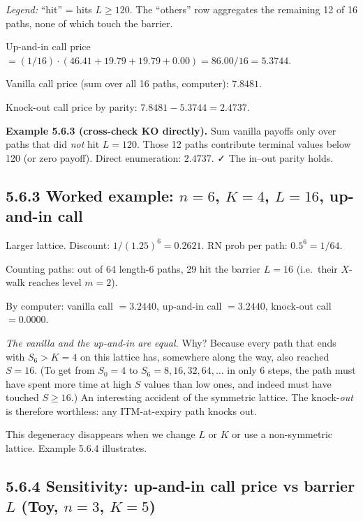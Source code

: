\documentclass[
  10pt,
  twoside]{book}
\newcounter{none} %
\begin{document}
\emph{Legend:} ``hit'' = hits \(L \ge 120\). The ``others'' row
aggregates the remaining 12 of 16 paths, none of which touch the
barrier.

Up-and-in call price
\(= (1/16) \cdot (46.41 + 19.79 + 19.79 + 0.00) = 86.00/16 = \mathbf{5.3744}\).

Vanilla call price (sum over all 16 paths, computer):
\(\mathbf{7.8481}\).

Knock-out call price by parity: \(7.8481 - 5.3744 = \mathbf{2.4737}\).

\textbf{Example 5.6.3 (cross-check KO directly).} Sum vanilla payoffs
only over paths that did \emph{not} hit \(L = 120\). Those 12 paths
contribute terminal values below 120 (or zero payoff). Direct
enumeration: \(2.4737\). ✓ The in--out parity holds.

\subsection{\texorpdfstring{5.6.3 Worked example: \(n = 6\), \(K = 4\),
\(L = 16\), up-and-in
call}{5.6.3 Worked example: n = 6, K = 4, L = 16, up-and-in call}}\label{worked-example-n-6-k-4-l-16-up-and-in-call}

Larger lattice. Discount: \(1/(1.25)^6 = 0.2621\). RN prob per path:
\(0.5^6 = 1/64\).

Counting paths: out of 64 length-6 paths, 29 hit the barrier \(L = 16\)
(i.e.~their \(X\)-walk reaches level \(m = 2\)).

By computer: vanilla call \(= 3.2440\), up-and-in call \(= 3.2440\),
knock-out call \(= 0.0000\).

\emph{The vanilla and the up-and-in are equal.} Why? Because every path
that ends with \(S_6 > K = 4\) on this lattice has, somewhere along the
way, also reached \(S = 16\). (To get from \(S_0 = 4\) to
\(S_6 = 8, 16, 32, 64, \ldots\) in only 6 steps, the path must have
spent more time at high \(S\) values than low ones, and indeed must have
touched \(S \ge 16\).) An interesting accident of the symmetric lattice.
The knock-\emph{out} is therefore worthless: any ITM-at-expiry path
knocks out.

This degeneracy disappears when we change \(L\) or \(K\) or use a
non-symmetric lattice. Example 5.6.4 illustrates.

\subsection{\texorpdfstring{5.6.4 Sensitivity: up-and-in call price vs
barrier \(L\) (Toy, \(n = 3\),
\(K = 5\))}{5.6.4 Sensitivity: up-and-in call price vs barrier L (Toy, n = 3, K = 5)}}\label{sensitivity-up-and-in-call-price-vs-barrier-l-toy-n-3-k-5}
\end{document}
